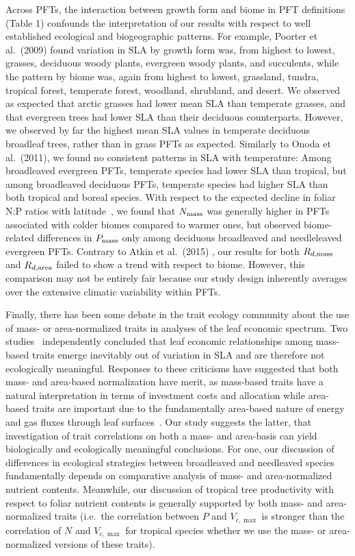 Across PFTs, the interaction between growth form and biome in PFT definitions (Table 1) confounds the interpretation of our results with respect to well established ecological and biogeographic patterns.
For example, Poorter et al.~(2009) \nocite{poorter_causes_2009} found variation in SLA by growth form was, from highest to lowest, grasses, deciduous woody plants, evergreen woody plants, and succulents, while the pattern by biome was, again from highest to lowest, grassland, tundra, tropical forest, temperate forest, woodland, shrubland, and desert.
We observed as expected that arctic grasses had lower mean SLA than temperate grasses, and that evergreen trees had lower SLA than their deciduous counterparts.
However, we observed by far the highest mean SLA values in temperate deciduous broadleaf trees, rather than in grass PFTs as expected.
Similarly to Onoda et al.~(2011), we found no consistent patterns in SLA with temperature: \nocite{onoda_2011_global}
Among broadleaved evergreen PFTs, temperate species had lower SLA than tropical, but among broadleaved deciduous PFTs, temperate species had higher SLA than both tropical and boreal species.
With respect to the expected decline in foliar N:P ratios with latitude~\cite{reich_global_2004}, we found that $N_{\text{mass}}$ was generally higher in PFTs associated with colder biomes compared to warmer ones, but observed biome-related differences in $P_{\text{mass}}$ only among deciduous broadleaved and needleleaved evergreen PFTs.
Contrary to Atkin et al.~(2015) \nocite{atkin_global_2015}, our results for both $R_{d,\text{mass}}$ and $R_{d,\text{area}}$ failed to show a trend with respect to biome.
However, this comparison may not be entirely fair because our study design inherently averages over the extensive climatic variability within PFTs.

Finally, there has been some debate in the trait ecology community about the use of mass- or area-normalized traits in analyses of the leaf economic spectrum.
Two studies~\cite{osnas_global_2013,lloyd_les} independently concluded that leaf economic relationships among mass-based traits emerge inevitably out of variation in SLA and are therefore not ecologically meaningful.
Responses to these criticisms have suggested that both mass- and area-based normalization have merit, as mass-based traits have a natural interpretation in terms of investment costs and allocation while area-based traits are important due to the fundamentally area-based nature of energy and gas fluxes through leaf surfaces~\cite{westoby_lloyd_response,poorter_les_response}.
Our study suggests the latter, that investigation of trait correlations on both a mass- and area-basis can yield biologically and ecologically meaningful conclusions.
For one, our discussion of differences in ecological strategies between broadleaved and needleaved species fundamentally depends on comparative analysis of mass- and area-normalized nutrient contents.
Meanwhile, our discussion of tropical tree productivity with respect to foliar nutrient contents is generally supported by both mass- and area-normalized traits (i.e.\ the correlation between $P$ and $V_{c,\max}$ is stronger than the correlation of $N$ and $V_{c,\max}$ for tropical species whether we use the mass- or area-normalized versions of these traits).


